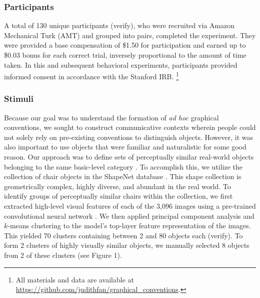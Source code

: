 \documentclass[10pt,letterpaper]{article}
\begin{document}
\subsubsection{Participants}
A total of 130 unique participants (verify), who were recruited via Amazon Mechanical Turk (AMT) and grouped into pairs, completed the experiment. They were provided a base compensation of \$1.50 for participation and earned up to \$0.03 bonus for each correct trial, inversely proportional to the amount of time taken. In this and subsequent behavioral experiments, participants provided informed consent in accordance with the Stanford IRB.
\footnote{All materials and data are available at \url{https://github.com/judithfan/graphical_conventions}.}

\subsubsection{Stimuli}
Because our goal was to understand the formation of \textit{ad hoc} graphical conventions, we sought to construct communicative contexts wherein people could not solely rely on pre-existing conventions to distinguish objects. 
However, it was also important to use objects that were familiar and naturalistic for some good reason.
Our approach was to define sets of perceptually similar real-world objects belonging to the same basic-level category \cite{MervisRosch81_CategorizationReview}.
To accomplish this, we utilize the collection of chair objects in the ShapeNet database \cite{chang2015shapenet}. 
This shape collection is  geometrically complex, highly diverse, and abundant in the real world. 
To identify groups of perceptually similar chairs within the collection, we first extracted high-level visual features of each of the 3,096 images using a pre-trained convolutional neural network \cite{simonyan2014very}. 
We then applied principal component analysis and $k$-means clustering to the model's top-layer feature representation of the images. 
This yielded 70 clusters containing between 2 and 80 objects each (verify). To form 2 clusters of highly visually similar objects, we manually selected 8 objects from 2 of these clusters (see Figure 1). 

\end{document}
